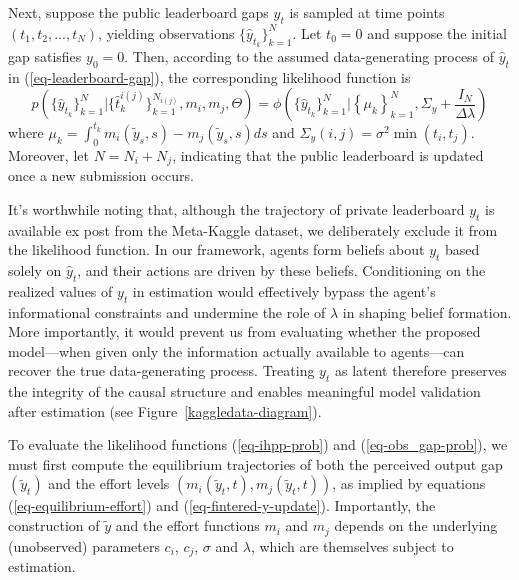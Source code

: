 \documentclass[mnsc]{informs3}
\begin{document}
Next, suppose the public leaderboard gaps $\hat{y}_t$ is sampled at time points $(t_1, t_2, ..., t_N)$, yielding observations $\{\hat{y}_{t_k}\}^N_{k=1}$. 
Let $t_0 = 0$ and suppose the initial gap satisfies $y_0 = 0$. 
Then, according to the assumed data-generating process of $\hat{y}_t$ in (\ref{eq-leaderboard-gap}), the corresponding likelihood function is
\begin{equation}\label{eq-obs_gap-prob}
p\left(\{\hat{y}_{t_k}\}_{k=1}^N | \{\hat{t}^{i(j)}_k\}_{k=1}^{N_{i(j)}}, m_i, m_j, \Theta\right) = 
\phi\left(\{\hat{y}_{t_k}\}_{k=1}^N | \left\{\mu_k\right\}^N_{k=1}, \Sigma_y+\frac{I_N}{\Delta\lambda}\right)
\end{equation}
where $\mu_k = \int_{0}^{t_{k}}m_i(\tilde{y}_s, s) - m_j(\tilde{y}_s, s)ds$ and $\Sigma_y(i, j) = \sigma^2\min(t_i,t_j)$. 
Moreover, let $N = N_i + N_j$, indicating that the public leaderboard is updated once a new submission occurs. 

It's worthwhile noting that, although the trajectory of private leaderboard $y_t$ is available ex post from the Meta-Kaggle dataset, we deliberately exclude it from the likelihood function. 
In our framework, agents form beliefs about $y_t$ based solely on $\hat{y}_t$, and their actions are driven by these beliefs. 
Conditioning on the realized values of $y_t$ in estimation would effectively bypass the agent’s informational constraints and undermine the role of $\lambda$ in shaping belief formation. 
More importantly, it would prevent us from evaluating whether the proposed model—when given only the information actually available to agents—can recover the true data-generating process. 
Treating $y_t$ as latent therefore preserves the integrity of the causal structure and enables meaningful model validation after estimation (see Figure~\ref{kaggledata-diagram}).

To evaluate the likelihood functions (\ref{eq-ihpp-prob}) and (\ref{eq-obs_gap-prob}), we must first compute the equilibrium trajectories of both the perceived output gap $(\tilde{y}_t)$ and the effort levels $(m_i(\tilde{y}_t, t), m_j(\tilde{y}_t, t))$, as implied by equations (\ref{eq-equilibrium-effort}) and (\ref{eq-fintered-y-update}). 
Importantly, the construction of $\tilde{y}$ and the effort functions $m_i$ and $m_j$ depends on the underlying (unobserved) parameters $c_i$, $c_j$, $\sigma$ and $\lambda$, which are themselves subject to estimation.
\end{document}
